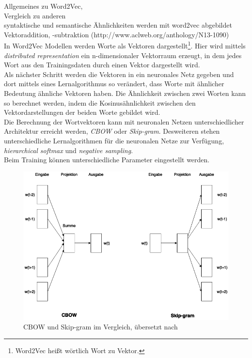 \documentclass[12pt,a4paper]{report}
\begin{document}
Allgemeines zu Word2Vec,\\
 Vergleich zu anderen\\
  syntaktische und semantische Ähnlichkeiten werden mit word2vec abgebildet\\
  Vektoraddition, -subtraktion (http://www.aclweb.org/anthology/N13-1090)\\
  

In Word2Vec Modellen werden Worte als Vektoren dargestellt\footnote{Word2Vec heißt wörtlich Wort zu Vektor.}. Hier wird mittels \textit{distributed representation}\cite{DBLP:journals/corr/abs-1301-3781} ein n-dimensionaler Vektorraum erzeugt, in dem jedes Wort aus den Trainingsdaten durch einen Vektor dargestellt wird.\\
Als nächster Schritt werden die Vektoren in ein neuronales Netz gegeben und dort mittels eines Lernalgorithmus so verändert, dass Worte mit ähnlicher Bedeutung ähnliche Vektoren haben. Die Ähnlichkeit zwischen zwei Worten kann so berechnet werden, indem die Kosinusähnlichkeit zwischen den Vektordarstellungen der beiden Worte gebildet wird.\\
Die Berechnung der Wortvektoren kann mit neuronalen Netzen unterschiedlicher Architektur erreicht werden, \textit{CBOW} oder \textit{Skip-gram}. Desweiteren stehen unterschiedliche Lernalgorithmen für die neuronalen Netze zur Verfügung, \textit{hierarchical softmax}  und \textit{negative sampling}.\\
Beim Training können unterschiedliche Parameter eingestellt werden.\\



\begin{figure}[h]
  \begin{center}
	\includegraphics[scale=0.55]{CBOWvsSkip-gram.png}
  \end{center}  
  \caption{CBOW und Skip-gram im Vergleich, übersetzt nach \cite{DBLP:journals/corr/abs-1301-3781}}
  \label{cbowvsskipgram}
\end{figure}
\end{document}
